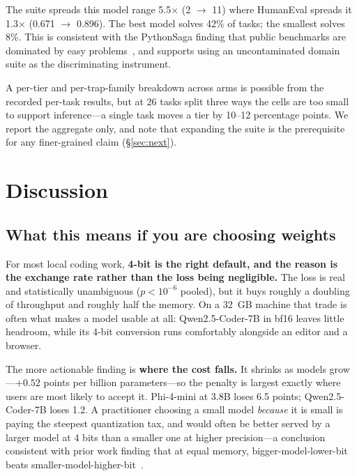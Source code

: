 \documentclass[11pt]{article}
\begin{document}
The suite spreads this model range 5.5$\times$ (2 $\to$ 11) where HumanEval spreads it
1.3$\times$ (0.671 $\to$ 0.896). The best model solves 42\% of tasks; the smallest solves
8\%. This is consistent with the PythonSaga finding that public benchmarks are dominated
by easy problems~\citep{yadav2024pythonsaga}, and supports using an uncontaminated domain
suite as the discriminating instrument.

A per-tier and per-trap-family breakdown across arms is possible from the recorded
per-task results, but at 26 tasks split three ways the cells are too small to support
inference---a single task moves a tier by 10--12 percentage points. We report the
aggregate only, and note that expanding the suite is the prerequisite for any
finer-grained claim (\S\ref{sec:next}).

\section{Discussion}
\label{sec:discussion}

\subsection{What this means if you are choosing weights}

For most local coding work, \textbf{4-bit is the right default, and the reason is the
exchange rate rather than the loss being negligible.} The loss is real and statistically
unambiguous ($p < 10^{-6}$ pooled), but it buys roughly a doubling of throughput and
roughly half the memory. On a 32~GB machine that trade is often what makes a model usable
at all: Qwen2.5-Coder-7B in bf16 leaves little headroom, while its 4-bit conversion runs
comfortably alongside an editor and a browser.

The more actionable finding is \textbf{where the cost falls.} It shrinks as models
grow---$+0.52$ points per billion parameters---so the penalty is largest exactly where
users are most likely to accept it. Phi-4-mini at 3.8B loses 6.5 points;
Qwen2.5-Coder-7B loses 1.2. A practitioner choosing a small model \emph{because} it is
small is paying the steepest quantization tax, and would often be better served by a
larger model at 4 bits than a smaller one at higher precision---a conclusion consistent
with prior work finding that at equal memory, bigger-model-lower-bit beats
smaller-model-higher-bit~\citep{jin2024comprehensive}.
\end{document}
